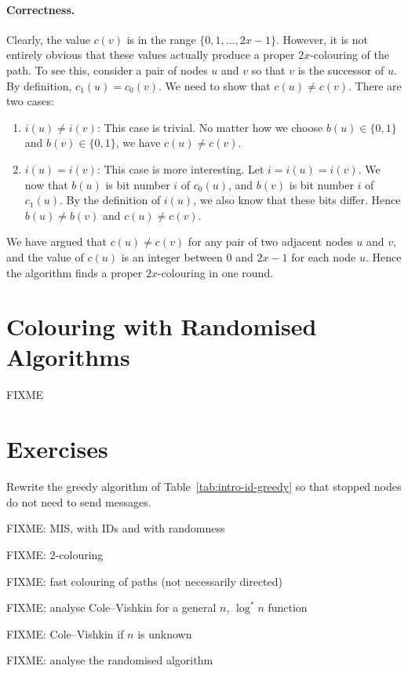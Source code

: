 \paragraph{Correctness.}
Clearly, the value $c(v)$ is in the range $\{0,1,\dotsc,2x-1\}$. However, it is not entirely obvious that these values actually produce a proper $2x$-colouring of the path. To see this, consider a pair of nodes $u$ and $v$ so that $v$ is the successor of $u$. By definition, $c_1(u) = c_0(v)$. We need to show that $c(u) \ne c(v)$. There are two cases:
\begin{enumerate}
    \item $i(u) \ne i(v)$: This case is trivial. No matter how we choose $b(u) \in \{0,1\}$ and $b(v) \in \{0,1\}$, we have $c(u) \ne c(v)$.
    \item $i(u) = i(v)$: This case is more interesting. Let $i = i(u) = i(v)$. We now that $b(u)$ is bit number $i$ of $c_0(u)$, and $b(v)$ is bit number $i$ of $c_1(u)$. By the definition of $i(u)$, we also know that these bits differ.    Hence $b(u) \ne b(v)$ and $c(u) \ne c(v)$.
\end{enumerate}
We have argued that $c(u) \ne c(v)$ for any pair of two adjacent nodes $u$ and $v$, and the value of $c(u)$ is an integer between $0$ and $2x-1$ for each node $u$. Hence the algorithm finds a proper $2x$-colouring in one round.


\section{Colouring with Randomised Algorithms}\label{sec:intro-pos-random}

FIXME

\section{Exercises}

\begin{ex}\label{ex:intro-stopped}
    Rewrite the greedy algorithm of Table~\ref{tab:intro-id-greedy} so that stopped nodes do not need to send messages.
\end{ex}

FIXME: MIS, with IDs and with randomness

FIXME: 2-colouring

\begin{ex}\label{ex:intro-undir-path}
    FIXME: fast colouring of paths (not necessarily directed)
\end{ex}

FIXME: analyse Cole--Vishkin for a general $n$, $\log^* n$ function

FIXME: Cole--Vishkin if $n$ is unknown

FIXME: analyse the randomised algorithm
